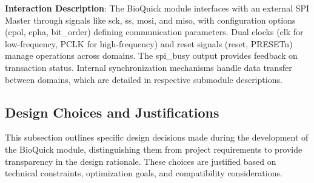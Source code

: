 \textbf{Interaction Description}: The BioQuick module interfaces with an external SPI Master through signals like sck, ss, mosi, and miso, with configuration options (cpol, cpha, bit\_order) defining communication parameters. Dual clocks (clk for low-frequency, PCLK for high-frequency) and reset signals (reset, PRESETn) manage operations across domains. The spi\_busy output provides feedback on transaction status. Internal synchronization mechanisms handle data transfer between domains, which are detailed in respective submodule descriptions.

\subsection{Design Choices and Justifications}\label{sec:design-choices}

This subsection outlines specific design decisions made during the development of the BioQuick module, distinguishing them from project requirements to provide transparency in the design rationale. These choices are justified based on technical constraints, optimization goals, and compatibility considerations.

